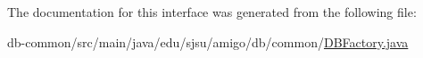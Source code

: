 The documentation for this interface was generated from the following file\+:\begin{DoxyCompactItemize}
\item 
db-\/common/src/main/java/edu/sjsu/amigo/db/common/\hyperlink{_d_b_factory_8java}{D\+B\+Factory.\+java}\end{DoxyCompactItemize}
